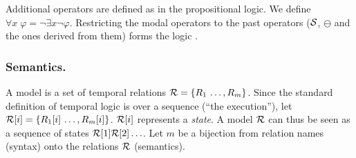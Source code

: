 
\noindent 
Additional operators are defined as in the propositional logic. We define
$\forall x \; \varphi = \neg \exists x \neg \varphi$.
Restricting the modal operators to the past operators
(${\cal S}$, $\ominus$ and the ones derived from them) 
forms the logic \PFLTL{}.

\subsubsection*{Semantics.}
A model is a set of temporal
 relations ${\cal R} = \{ R_1 \, \ldots , R_m \}$.
 Since the standard definition of temporal logic is
 over a sequence (``the execution''), let
 ${\cal R} [ i ] = \{ R_1 [ i ] \, \ldots , R_m [ i ] \}$. ${\cal R} [i]$ represents a {\em state}.
 A model ${\cal R}$ can thus be seen as a sequence
 of states ${\cal R}[1] {\cal R}[2] \ldots$. Let 
 $m$ be a bijection
from relation names (syntax)
onto the relations ${\cal R}$ (semantics).


